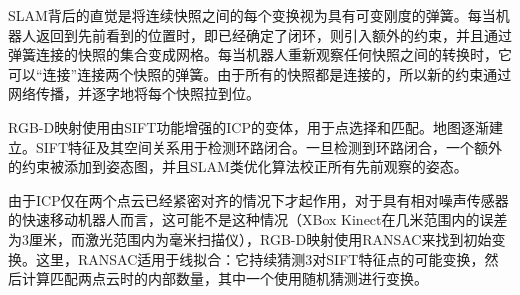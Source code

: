 SLAM背后的直觉是将连续快照之间的每个变换视为具有可变刚度的弹簧。每当机器人返回到先前看到的位置时，即已经确定了闭环，则引入额外的约束，并且通过弹簧连接的快照的集合变成网格。每当机器人重新观察任何快照之间的转换时，它可以“连接”连接两个快照的弹簧。由于所有的快照都是连接的，所以新的约束通过网络传播，并逐字地将每个快照拉到位。

RGB-D映射使用由SIFT功能增强的ICP的变体，用于点选择和匹配。地图逐渐建立。SIFT特征及其空间关系用于检测环路闭合。一旦检测到环路闭合，一个额外的约束被添加到姿态图，并且SLAM类优化算法校正所有先前观察的姿态。

由于ICP仅在两个点云已经紧密对齐的情况下才起作用，对于具有相对噪声传感器的快速移动机器人而言，这可能不是这种情况（XBox Kinect在几米范围内的误差为3厘米，而激光范围内为毫米扫描仪），RGB-D映射使用RANSAC来找到初始变换。这里，RANSAC适用于线拟合：它持续猜测3对SIFT特征点的可能变换，然后计算匹配两点云时的内部数量，其中一个使用随机猜测进行变换。